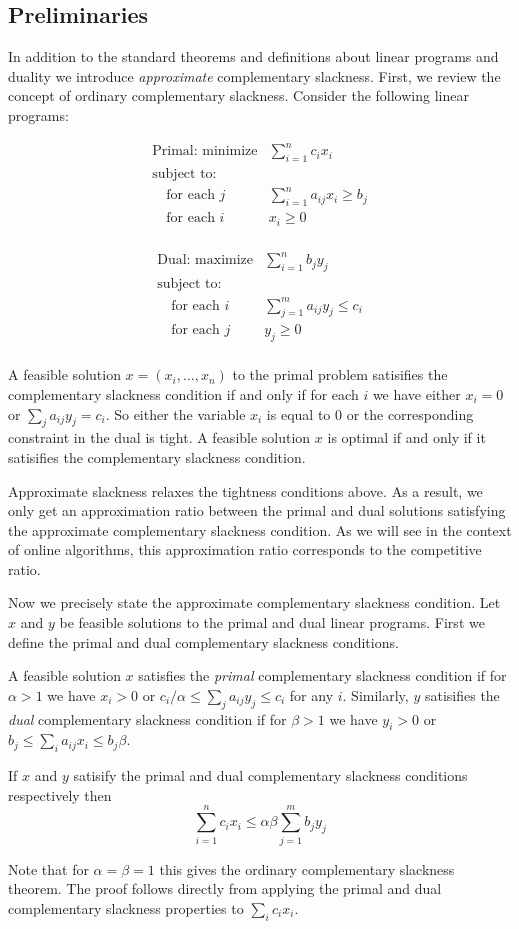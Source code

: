 \subsection{Preliminaries}
In addition to the standard theorems and definitions about linear programs and duality we introduce \emph{approximate} complementary slackness.
First, we review the concept of ordinary complementary slackness.
Consider the following linear programs:

\[
\begin{array}{lr}
  \textrm{Primal: minimize}   & \sum^n_{i=1} c_i x_i  \\
  \textrm{subject to:} & \\
  \quad \textrm{for each $j$} & \sum_{i=1}^n a_{ij} x_i \geq b_j \\
  \quad \textrm{for each $i$} & x_i \geq 0 \\
\end{array}
\]

\[
\begin{array}{lr}
  \textrm{Dual: maximize}   & \sum^n_{i=1} b_j y_j  \\
  \textrm{subject to:} & \\
  \quad \textrm{for each $i$} & \sum_{j=1}^m a_{ij} y_j \leq c_i \\
  \quad \textrm{for each $j$} & y_j \geq 0 \\
\end{array}
\]

A feasible solution $x = (x_i, \ldots, x_n)$ to the primal problem satisifies the complementary slackness condition if and only if for each $i$ we have either $x_i = 0$ or $\sum_{j} a_{ij}y_j = c_i$.
So either the variable $x_i$ is equal to 0 or the corresponding constraint in the dual is tight.
A feasible solution $x$ is optimal if and only if it satisifies the complementary slackness condition.

Approximate slackness relaxes the tightness conditions above.
As a result, we only get an approximation ratio between the primal and dual solutions satisfying the approximate complementary slackness condition.
As we will see in the context of online algorithms, this approximation ratio corresponds to the competitive ratio.

Now we precisely state the approximate complementary slackness condition.
Let $x$ and $y$ be feasible solutions to the primal and dual linear programs.
First we define the primal and dual complementary slackness conditions.

A feasible solution $x$ satisfies the \emph{primal} complementary slackness condition if for $\alpha > 1$ we have $x_i > 0$ or $c_i / \alpha \leq \sum_j a_{ij} y_j \leq c_i$ for any $i$.
Similarly, $y$ satisifies the \emph{dual} complementary slackness condition if for $\beta > 1$ we have $y_i > 0$ or $b_j \leq \sum_i a_{ij} x_i \leq b_j \beta$.

If $x$ and $y$ satisify the primal and dual complementary slackness conditions respectively then 
\[
\sum_{i=1}^n c_i x_i  \leq \alpha \beta  \sum_{j=1}^m b_j y_j
\]

Note that for $\alpha = \beta = 1$ this gives the ordinary complementary slackness theorem.
The proof follows directly from applying the primal and dual complementary slackness properties to $\sum_i c_i x_i$.
